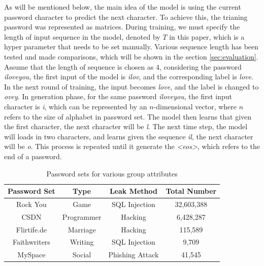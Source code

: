 \documentclass[10pt, twocolumnjournal]{IEEEtran}
\begin{document}
As will be mentioned below, the main idea of the model is using the current password character to predict the next character. To achieve this, the trianing password was represented as matrices.  During training, we must specify the length of input sequence in the model, denoted by $T$ in this paper, which is a hyper parameter that needs to be set manually. Various sequence length has been tested and made comparisons, which will be shown in the section \ref{sec:evaluation}. Assume that the length of sequence is chosen as $4$, considering the password \emph{iloveyou}, the first input of the model is \emph{ilov}, and the corresponding label is \emph{love}. In the next round of training, the input becomes \emph{love}, and the label is changed to \emph{ovey}. In generation phase, for the same password \emph{iloveyou}, the first input character is \emph{i}, which can be represented by an $n$-dimensional vector, where $n$ refers to the size of  alphabet in password set. The model then learns that given the first character, the next character will be \emph{l}. The next time step, the model will loads in two characters, and learns given the sequence \emph{il}, the next character will be \emph{o}. This process is repeated until it generate the \emph{\textless eos\textgreater}, which refers to the end of a password.

\begin{table}
	\caption{Password sets for various group attributes}
	\label{tb:password_set}
	\centering
	\begin{tabular}{|c||c|c|c|}
	\hline
	\textbf{Password Set} & \textbf{Type} & \textbf{Leak Method}& \textbf{Total Number}  \\
	\hline
	Rock You & Game & SQL Injection & 32,603,388 \\ 
	\hline
	CSDN & Programmer & Hacking & 6,428,287 \\ 
	\hline   
	Flirtife.de & Marriage & Hacking & 115,589 \\ 
	\hline  
	Faithwriters & Writing & SQL Injection & 9,709 \\ 
	\hline 
	MySpace & Social & Phishing Attack & 41,545 \\ 
	\hline    
	\end{tabular}
\end{table}
	
\end{document}
